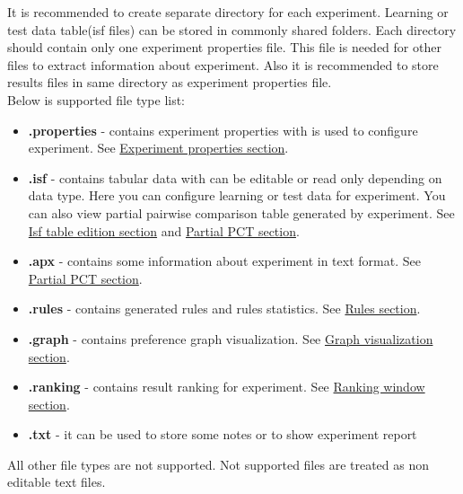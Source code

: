 It is recommended to create separate directory for each experiment. Learning or test data table(isf files) can be stored in commonly shared folders. Each directory should contain only one experiment properties file. This file is needed for other files to extract information about experiment. Also it is recommended to store results files in same directory as experiment properties file.\\

Below is supported file type list:
\begin{itemize}
	\item \textbf{.properties} - contains experiment properties with is used to configure experiment. See \hyperref[section:properties]{Experiment properties section}.
	\item \textbf{.isf} - contains tabular data with can be editable or read only depending on data type. Here you can configure learning or test data for experiment. You can also view partial pairwise comparison table generated by experiment.
	See \hyperref[section:isf-table]{Isf table edition section} and  \hyperref[sub:pct-isf]{Partial PCT section}.
	\item \textbf{.apx} - contains some information about experiment in text format.
	See \hyperref[sub:pct-apx]{Partial PCT section}.
	\item \textbf{.rules} - contains generated rules and rules statistics.
	See \hyperref[section:rules]{Rules section}.
	\item \textbf{.graph} - contains preference graph visualization.
	See \hyperref[section:graph]{Graph visualization section}.
	\item \textbf{.ranking} - contains result ranking for experiment.
	See \hyperref[section:ranking]{Ranking window section}.
	\item \textbf{.txt} - it can be used to store some notes or to show experiment report
\end{itemize}

All other file types are not supported. Not supported files are treated as non editable text files.

\vfill\newpage